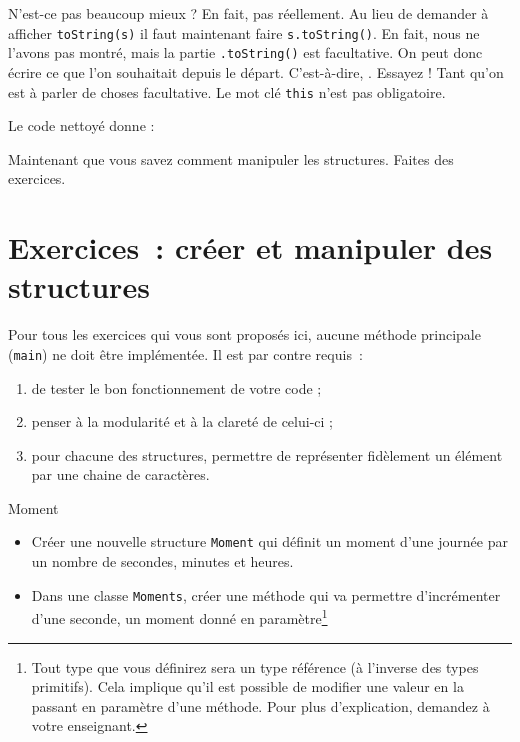 \documentclass[a4paper,11pt]{article}
\begin{document}

	N'est-ce pas beaucoup mieux ? En fait, pas réellement. Au lieu de demander à afficher \texttt{toString(s)} il faut maintenant faire \texttt{s.toString()}. En fait, nous ne l'avons pas montré, mais la partie \texttt{.toString()} est facultative. On peut donc écrire ce que l'on souhaitait depuis le départ. C'est-à-dire, . Essayez ! Tant qu'on est à parler de choses facultative. Le mot clé \texttt{this} n'est pas obligatoire.

	Le code nettoyé donne :

	Maintenant que vous savez comment manipuler les \og structures\fg. Faites des exercices.


	\bigskip

\section{Exercices~: créer et manipuler des structures}
	
	Pour tous les exercices qui vous sont proposés ici, aucune méthode principale (\texttt{main}) ne doit être implémentée. Il est par contre requis~:
	\begin{enumerate}
		\item de tester le bon fonctionnement de votre code ;
		\item penser à la modularité et à la clareté de celui-ci ;
		\item pour chacune des structures, permettre de représenter fidèlement un élément par une chaine de caractères.
	\end{enumerate}

	\begin{Exercice}{Moment}
		\begin{itemize}
			\item
				Créer une nouvelle structure \texttt{Moment} qui définit un moment d'une journée par un nombre de secondes, minutes et heures.
			\item 
				Dans une classe \texttt{Moments}, créer une méthode  qui va permettre d'incrémenter d'une seconde, un moment donné en paramètre\footnote{Tout type que vous définirez sera un type référence (à l'inverse des types primitifs). Cela implique qu'il est possible de modifier une valeur en la passant en paramètre d'une méthode. Pour plus d'explication, demandez à votre enseignant.}
		\end{itemize}		
	\end{Exercice}
\end{document}
